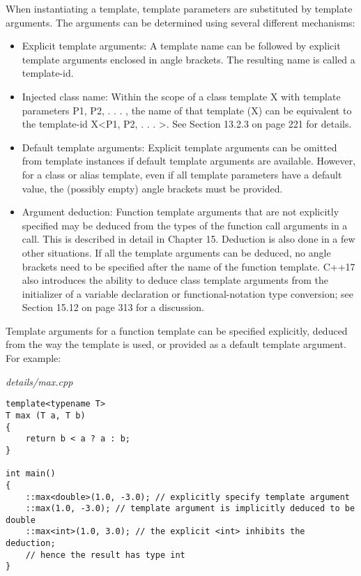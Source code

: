 
When instantiating a template, template parameters are substituted by template arguments. The arguments can be determined using several different mechanisms:

\begin{itemize}
\item 
Explicit template arguments: A template name can be followed by explicit template arguments enclosed in angle brackets. The resulting name is called a template-id.

\item 
Injected class name: Within the scope of a class template X with template parameters P1, P2, . . . , the name of that template (X) can be equivalent to the template-id X<P1, P2, . . . >. See Section 13.2.3 on page 221 for details.

\item 
Default template arguments: Explicit template arguments can be omitted from template instances if default template arguments are available. However, for a class or alias template, even if all template parameters have a default value, the (possibly empty) angle brackets must be provided.


\item 
Argument deduction: Function template arguments that are not explicitly specified may be deduced from the types of the function call arguments in a call. This is described in detail in Chapter 15. Deduction is also done in a few other situations. If all the template arguments can be deduced, no angle brackets need to be specified after the name of the function template. C++17 also introduces the ability to deduce class template arguments from the initializer of a variable declaration or functional-notation type conversion; see Section 15.12 on page 313 for a discussion.
\end{itemize}


Template arguments for a function template can be specified explicitly, deduced from the way the template is used, or provided as a default template argument. For example:

\noindent
\textit{details/max.cpp}
\begin{lstlisting}[style=styleCXX]
template<typename T>
T max (T a, T b)
{
	return b < a ? a : b;
}

int main()
{
	::max<double>(1.0, -3.0); // explicitly specify template argument
	::max(1.0, -3.0); // template argument is implicitly deduced to be double
	::max<int>(1.0, 3.0); // the explicit <int> inhibits the deduction;
	// hence the result has type int
}
\end{lstlisting}

